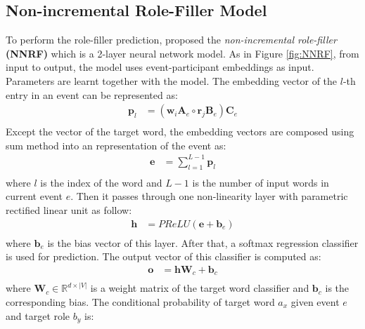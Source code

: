 \documentclass[a4paper]{article}
\begin{document}
\subsection{Non-incremental Role-Filler Model} \label{sec:nnrf}
To perform the role-filler prediction, \citet{tilk2016event} proposed the \textit{non-incremental role-filler} \textbf{(NNRF)} which is a 2-layer neural network model. As in Figure \ref{fig:NNRF}, from input to output, the model uses event-participant embeddings as input. Parameters are learnt together with the model. The embedding vector of the $l$-th entry in an event can be represented as:
\begin{equation} \label{eq:rbe-nnrf}
\begin{aligned}
    \mathbf{p}_l
        &= (\mathbf{w}_i \mathbf{A}_e \circ \mathbf{r}_j \mathbf{B}_e) \mathbf{C}_e \\
\end{aligned}
\end{equation}
Except the vector of the target word, the embedding vectors are composed using sum method into an representation of the event as:
\begin{equation} \label{eq:sum-comp}
\begin{aligned}
    \mathbf{e}
        &= \sum_{l=1}^{L-1} \mathbf{p}_{l} \\
\end{aligned}
\end{equation}
where $l$ is the index of the word and $L-1$ is the number of input words in current event $e$. Then it passes through one non-linearity layer with parametric rectified linear unit \citep{he2015delving} as follow:
\begin{equation} \label{eq:nonlinearity-nnrf}
\begin{aligned}
    \mathbf{h}
        &= PReLU(\mathbf{e} + \mathbf{b}_e) \\
\end{aligned}
\end{equation}
where $\mathbf{b}_e$ is the bias vector of this layer. After that, a softmax regression classifier is used for prediction. The output vector of this classifier is computed as:
\begin{equation} \label{eq:output-nnrf}
\begin{aligned}
    \mathbf{o}
        &= \mathbf{h}\mathbf{W}_c + \mathbf{b}_c \\
\end{aligned}
\end{equation}
where $\mathbf{W}_c\in \mathbb{R}^{d \times |V|}$ is a weight matrix of the target word classifier and $\mathbf{b}_c$ is the corresponding bias. The conditional probability of target word $a_x$ given event $e$ and target role $b_y$ is:
\end{document}
